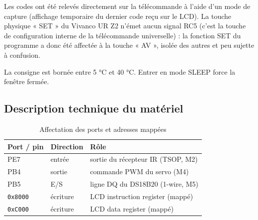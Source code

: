 \documentclass[11pt]{article}
\begin{document}
\begin{table}[h]
\centering
{}
\caption{Codes RC5 et effets des touches selon le mode}
\label{tab:rc5_codes}
\end{table}

Les codes ont été relevés directement sur la télécommande à l'aide d'un mode de capture (affichage temporaire du dernier code reçu sur le LCD). La touche physique « SET » du Vivanco UR Z2 n'émet aucun signal RC5 (c'est la touche de configuration interne de la télécommande universelle) : la fonction SET du programme a donc été affectée à la touche « AV », isolée des autres et peu sujette à confusion.

La consigne est bornée entre 5 °C et 40 °C. Entrer en mode SLEEP force la fenêtre fermée.

\subsection{Description technique du matériel}


\begin{table}[h]
\centering
\begin{tabular}{@{}llp{7cm}@{}}
\toprule
\textbf{Port / pin} & \textbf{Direction} & \textbf{Rôle} \\
\midrule
PE7             & entrée   & sortie du récepteur IR (TSOP, M2) \\
PB4             & sortie   & commande PWM du servo (M4) \\
PB5             & E/S      & ligne DQ du DS18B20 (1-wire, M5) \\
\texttt{0x8000} & écriture & LCD instruction register (mappé) \\
\texttt{0xC000} & écriture & LCD data register (mappé) \\
\bottomrule
\end{tabular}
\caption{Affectation des ports et adresses mappées}
\label{tab:port_pin}
\end{table}
\end{document}
